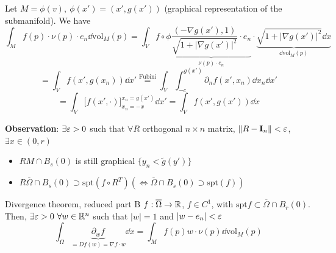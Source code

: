 \documentclass[12pt]{article}
\begin{document}
\begin{proofbox}
    Let $M = \phi(v),\ \phi(x') = (x', g(x'))$ (graphical representation of the submanifold). We have
    $$
        \int_M f(p) \cdot \nu(p) \cdot e_n \dd \mathrm{vol}_M(p) = \int_{V} f \circ \phi \underbrace{\frac{(- \nabla g(x'), 1)}{\sqrt{1 + \lvert \nabla g(x') \rvert^2}} \cdot e_n}_{\nu(p) \cdot e_n} \cdot \underbrace{\sqrt{1 + \lvert \nabla g(x') \rvert^2} \dd x}_{\dd \mathrm{vol}_M (p)}
    $$
    $$
        = \int_V f(x', g(x_n)) \dd x' \overset{\text{Fubini}}= \int_V \int_{-c}^{g(x')} \partial_n f(x', x_n) \dd x_n \dd x'
    $$
    $$
        = \int_V \Big[ f(x', \cdot) \Big]_{x_n = -x}^{x_n = g(x')} \dd x' = \int_V f(x', g(x')) \dd x
    $$
\end{proofbox}

\textbf{Observation}: $\exists \varepsilon > 0$ such that $\forall R$ orthogonal $n \times n$ matrix, $\lVert R - \mathbf{I}_n \rVert < \varepsilon$, $\exists x \in (0, r)$
\begin{itemize}
    \item $R M \cap B_s(0)$ is still graphical $\{y_n < \tilde{g}(y')\}$
    \item $R \overline{\Omega} \cap B_s(0) \supset \mathrm{spt}(f \circ R^T) \left( \iff \overline{\Omega} \cap B_s(0) \supset \mathrm{spt}(f)\right)$
\end{itemize}

\begin{lemma}{Divergence theorem, reduced part B}{}
    $f: \overline{\Omega} \rightarrow \mathbb{R}$, $f \in C^1$, with $\mathrm{spt}f \subset \overline{\Omega} \cap B_r(0)$. Then, $\exists \varepsilon > 0 \ \forall w \in \mathbb{R}^n$ such that $|w |= 1$ and $|w - e_n| < \varepsilon$
    $$
        \int_\Omega \underbrace{\partial_w f}_{= D f(w) = \nabla f\cdot w} \dd x = \int_M f(p) w \cdot \nu(p) \dd \mathrm{vol}_M(p)
    $$
\end{lemma}
\end{document}
